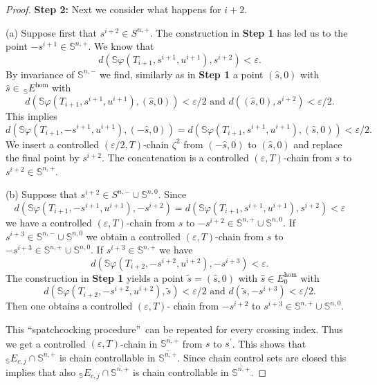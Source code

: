 \documentclass[preprint,12pt]{elsarticle}
\begin{document}
\begin{proof}
\textbf{Step 2: }Next we consider what happens for $i+2$.

(a) Suppose first that $s^{i+2}\in S^{n,+}$. The construction in \textbf{Step
1} has led us to the point $-s^{i+1}\in\mathbb{S}^{n,+}$. We know that%
\[
d(\mathbb{S}\varphi(T_{i+1},s^{i+1},u^{i+1}),s^{i+2})<\varepsilon.
\]
By invariance of $\mathbb{S}^{n,-}$ we find, similarly as in \textbf{Step 1} a
point $(\widehat{s},0)$ with $\widehat{s}\in\,_{\mathbb{S}}E^{\hom}$ with%
\[
d(\mathbb{S}\varphi(T_{i+1},s^{i+1},u^{i+1}),(\widehat{s},0))<\varepsilon
/2\text{ and }d((\widehat{s},0),s^{i+2})<\varepsilon/2.
\]
This implies%
\[
d(\mathbb{S}\varphi(T_{i+1},-s^{i+1},u^{i+1}),(-\widehat{s},0))=d(\mathbb{S}%
\varphi(T_{i+1},s^{i+1},u^{i+1}),(\widehat{s},0))<\varepsilon/2.
\]
We insert a controlled $(\varepsilon/2,T)$-chain $\zeta^{2}$ from
$(-\widehat{s},0)$ to $(\widehat{s},0)$ and replace the final point by
$s^{i+2}$. The concatenation is a controlled $(\varepsilon,T)$-chain from $s$
to $s^{i+2}\in\mathbb{S}^{n,+}$.

(b) Suppose that $s^{i+2}\in S^{n,-}\cup\mathbb{S}^{n,0}$. Since%
\begin{equation}
d(\mathbb{S}\varphi(T_{i+1},-s^{i+1},u^{i+1}),-s^{i+2})=d(\mathbb{S}%
\varphi(T_{i+1},s^{i+1},u^{i+1}),s^{i+2})<\varepsilon\label{final}%
\end{equation}
we have a controlled $(\varepsilon,T)$-chain from $s$ to $-s^{i+2}%
\in\mathbb{S}^{n,+}\cup\mathbb{S}^{n,0}$. If $s^{i+3}\in\mathbb{S}^{n,-}%
\cup\mathbb{S}^{n,0}$ we obtain a controlled $(\varepsilon,T)$-chain from $s$
to $-s^{i+3}\in\mathbb{S}^{n,+}\cup\mathbb{S}^{n,0}$. If $s^{i+3}\in
\mathbb{S}^{n,+}$ we have%
\[
d(\mathbb{S}\varphi(T_{i+2},-s^{i+2},u^{i+2}),-s^{i+3})<\varepsilon.
\]
The construction in \textbf{Step 1} yields a point $\widetilde{s}=(\widehat
{s},0)$ with $\widehat{s}\in E_{0}^{\hom}$ with%
\[
d(\mathbb{S}\varphi(T_{i+2},-s^{i+2},u^{i+2}),\widetilde{s})<\varepsilon
/2\text{ and }d(\widetilde{s},-s^{i+3})<\varepsilon/2.
\]
Then one obtains a controlled $(\varepsilon,T)$- chain from $-s^{i+2}$ to
$s^{i+3}\in\mathbb{S}^{n,+}\cup\mathbb{S}^{n,0}$.

This \textquotedblleft spatchcocking procedure\textquotedblright\ can be
repeated for every crossing index. Thus we get a controlled $(\varepsilon
,T)$-chain in $\overline{\mathbb{S}^{n,+}}$ from $s$ to $s^{\prime}$. This
shows that $_{\mathbb{S}}E_{c,j}\cap\mathbb{S}^{n,+}$ is chain controllable in
$\overline{\mathbb{S}^{n,+}}$. Since chain control sets are closed this
implies that also $_{\mathbb{S}}E_{c,j}\cap\overline{\mathbb{S}^{n,+}}$ is
chain controllable in $\overline{\mathbb{S}^{n,+}}$.
\end{proof}
\end{document}
